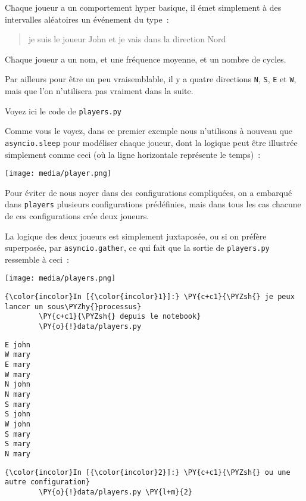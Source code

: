 Chaque joueur a un comportement hyper basique, il émet simplement à des
intervalles aléatoires un événement du type~:

\begin{quote}
je suis le joueur John et je vais dans la direction Nord
\end{quote}

Chaque joueur a un nom, et une fréquence moyenne, et un nombre de
cycles.

Par ailleurs pour être un peu vraisemblable, il y a quatre directions
\texttt{N}, \texttt{S}, \texttt{E} et \texttt{W}, mais que l'on
n'utilisera pas vraiment dans la suite.

    Voyez ici le code de \texttt{players.py}

    Comme vous le voyez, dans ce premier exemple nous n'utilisons à nouveau
que \texttt{asyncio.sleep} pour modéliser chaque joueur, dont la logique
peut être illustrée simplement comme ceci (où la ligne horizontale
représente le temps)~:

    \texttt{[image: media/player.png]}

    Pour éviter de nous noyer dans des configurations compliquées, on a
embarqué dans \texttt{players} plusieurs configurations prédéfinies,
mais dans tous les cas chacune de ces configurations crée deux joueurs.

    La logique des deux joueurs est simplement juxtaposée, ou si on préfère
superposée, par \texttt{asyncio.gather}, ce qui fait que la sortie de
\texttt{players.py} ressemble à ceci~:

    \texttt{[image: media/players.png]}

    \begin{Verbatim}[commandchars=\\\{\},frame=single,framerule=0.3mm,rulecolor=\color{cellframecolor}]
{\color{incolor}In [{\color{incolor}1}]:} \PY{c+c1}{\PYZsh{} je peux lancer un sous\PYZhy{}processus}
        \PY{c+c1}{\PYZsh{} depuis le notebook}
        \PY{o}{!}data/players.py
\end{Verbatim}


    \begin{Verbatim}[commandchars=\\\{\},frame=single,framerule=0.3mm,rulecolor=\color{cellframecolor}]
E john
W mary
E mary
W mary
N john
N mary
S mary
S john
W john
S mary
S mary
N mary
\end{Verbatim}

    \begin{Verbatim}[commandchars=\\\{\},frame=single,framerule=0.3mm,rulecolor=\color{cellframecolor}]
{\color{incolor}In [{\color{incolor}2}]:} \PY{c+c1}{\PYZsh{} ou une autre configuration}
        \PY{o}{!}data/players.py \PY{l+m}{2}
\end{Verbatim}


